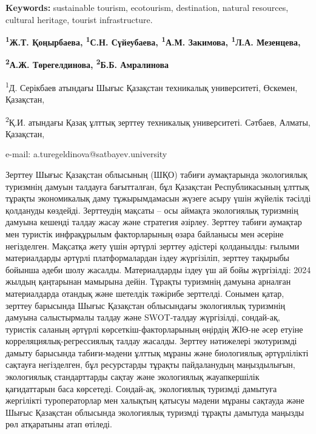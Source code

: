 {\bfseries Keywords:} sustainable tourism, ecotourism, destination,
natural resources, cultural heritage, tourist infrastructure.


\begin{center}
{\bfseries \textsuperscript{1}Ж.Т. Қоңырбаева, \textsuperscript{1}С.Н.
Сүйеубаева, \textsuperscript{1}А.М. Закимова, \textsuperscript{1}Л.А.
Мезенцева,}

{\bfseries \textsuperscript{2}А.Ж. Төрегелдинова\envelope,
\textsuperscript{2}Б.Б. Амралинова}

\textsuperscript{1}Д. Серікбаев атындағы Шығыс Қазақстан техникалық
университеті, Өскемен, Қазақстан,

\textsuperscript{2}Қ.И. атындағы Қазақ ұлттық зерттеу техникалық
университеті. Сәтбаев, Алматы, Қазақстан,

e-mail: a.turegeldinova@satbayev.university
\end{center}

Зерттеу Шығыс Қазақстан облысының (ШҚО) табиғи аумақтарында экологиялық
туризмнің дамуын талдауға бағытталған, бұл Қазақстан Республикасының
ұлттық тұрақты экономикалық даму тұжырымдамасын жүзеге асыру үшін
жүйелік тәсілді қолдануды көздейді. Зерттеудің мақсаты -- осы аймақта
экологиялық туризмнің дамуына кешенді талдау жасау және стратегия
әзірлеу. Зерттеу табиғи аумақтар мен туристік инфрақұрылым факторларының
өзара байланысы мен әсеріне негізделген. Мақсатқа жету үшін әртүрлі
зерттеу әдістері қолданылды: ғылыми материалдарды әртүрлі
платформалардан іздеу жүргізіліп, зерттеу тақырыбы бойынша әдеби шолу
жасалды. Материалдарды іздеу үш ай бойы жүргізілді: 2024 жылдың
қаңтарынан мамырына дейін. Тұрақты туризмнің дамуына арналған
материалдарда отандық және шетелдік тәжірибе зерттелді. Сонымен қатар,
зерттеу барысында Шығыс Қазақстан облысындағы экологиялық туризмнің
дамуына салыстырмалы талдау және SWOT-талдау жүргізілді, сондай-ақ,
туристік саланың әртүрлі көрсеткіш-факторларының өңірдің ЖІӨ-не әсер
етуіне корреляциялық-регрессиялық талдау жасалды. Зерттеу нәтижелері
экотуризмді дамыту барысында табиғи-мәдени ұлттық мұраны және
биологиялық әртүрлілікті сақтауға негізделген, бұл ресурстарды тұрақты
пайдаланудың маңыздылығын, экологиялық стандарттарды сақтау және
экологиялық жауапкершілік қағидаттарын баса көрсетеді. Сондай-ақ,
экологиялық туризмді дамытуға жергілікті туроператорлар мен халықтың
қатысуы мәдени мұраны сақтауда және Шығыс Қазақстан облысында
экологиялық туризмді тұрақты дамытуда маңызды рөл атқаратыны атап
өтіледі.

